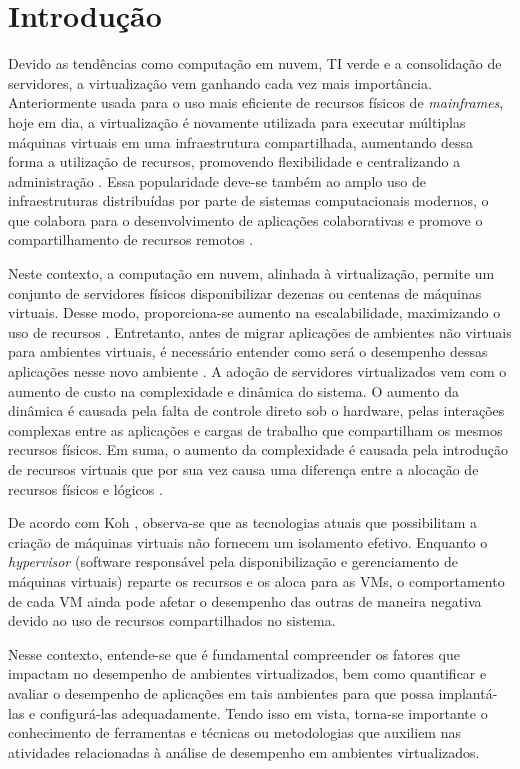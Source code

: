 \section{Introdução}
\label{sec:introducao}

Devido as tendências como computação em nuvem, TI verde e a consolidação de
servidores, a virtualização vem ganhando cada vez mais importância.
Anteriormente usada para o uso mais eficiente de recursos físicos de
\textit{mainframes}, hoje em dia, a virtualização é novamente utilizada para
executar múltiplas máquinas virtuais em uma infraestrutura compartilhada,
aumentando dessa forma a utilização de recursos, promovendo flexibilidade e
centralizando a administração \cite{huber2011}. Essa popularidade deve-se
também ao amplo uso de infraestruturas distribuídas por parte de sistemas
computacionais modernos, o que colabora para o desenvolvimento de aplicações
colaborativas e promove o compartilhamento de recursos remotos
\cite{popiolek2012}.

Neste contexto, a computação em nuvem, alinhada à virtualização, permite um
conjunto de servidores físicos disponibilizar dezenas ou centenas de máquinas
virtuais. Desse modo, proporciona-se aumento na escalabilidade, maximizando o
uso de recursos \cite{popiolek2012}. Entretanto, antes de migrar aplicações de
ambientes não virtuais para ambientes virtuais, é necessário entender como será
o desempenho dessas aplicações nesse novo ambiente \cite{benevuto2006}. A
adoção de servidores virtualizados vem com o aumento de custo na complexidade e
dinâmica do sistema. O aumento da dinâmica é causada pela falta de controle
direto sob o hardware, pelas interações complexas entre as aplicações e cargas
de trabalho que compartilham os mesmos recursos físicos. Em suma, o aumento da
complexidade é causada pela introdução de recursos virtuais que por sua vez
causa uma diferença entre a alocação de recursos físicos e lógicos
\cite{huber2011}.

De acordo com Koh \cite{koh2007}, observa-se que as tecnologias atuais que
possibilitam a criação de máquinas virtuais não fornecem um isolamento efetivo.
Enquanto o \textit{hypervisor} (software responsável pela disponibilização e
gerenciamento de máquinas virtuais) reparte os recursos e os aloca para as VMs,
o comportamento de cada VM ainda pode afetar o desempenho das outras de maneira
negativa devido ao uso de recursos compartilhados no sistema.

Nesse contexto, entende-se que é fundamental compreender os fatores que
impactam no desempenho de ambientes virtualizados, bem como quantificar e
avaliar o desempenho de aplicações em tais ambientes para que possa
implantá-las e configurá-las adequadamente. Tendo isso em vista, torna-se
importante o conhecimento de ferramentas e técnicas ou metodologias que
auxiliem nas atividades relacionadas à análise de desempenho em ambientes
virtualizados.

